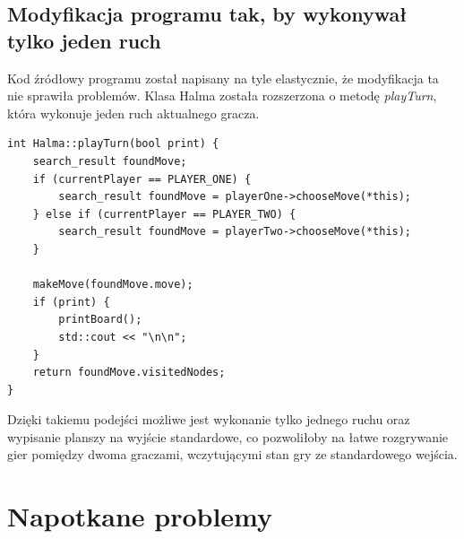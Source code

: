\documentclass[a4paper, 12pt]{article}
\begin{document}
\subsection{Modyfikacja programu tak, by wykonywał tylko jeden ruch}
Kod źródłowy programu został napisany na tyle elastycznie,
że modyfikacja ta nie sprawiła problemów. 
Klasa Halma została rozszerzona o metodę \textit{playTurn}, która
wykonuje jeden ruch aktualnego gracza.
\begin{lstlisting}
int Halma::playTurn(bool print) {
    search_result foundMove;
    if (currentPlayer == PLAYER_ONE) {
        search_result foundMove = playerOne->chooseMove(*this);
    } else if (currentPlayer == PLAYER_TWO) {
        search_result foundMove = playerTwo->chooseMove(*this);
    }

    makeMove(foundMove.move);
    if (print) {
        printBoard();
        std::cout << "\n\n";
    }
    return foundMove.visitedNodes;
}
\end{lstlisting}
Dzięki takiemu podejści możliwe jest wykonanie tylko jednego ruchu oraz wypisanie 
planszy na wyjście standardowe, co pozwoliłoby na 
łatwe rozgrywanie gier pomiędzy dwoma graczami, wczytującymi stan gry ze standardowego 
wejścia.


\section{Napotkane problemy}
\end{document}
